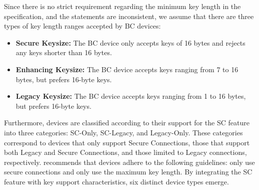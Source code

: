 \documentclass[../main.tex]{subfiles}  %
\begin{document}
Since there is no strict requirement regarding the minimum key length in the specification, and the statements are inconsistent, we assume that there are three types of key length ranges accepted by BC devices:
\begin{itemize}[leftmargin=*]
    \item \textbf{Secure Keysize:} The BC device only accepts keys of 16 bytes and rejects any keys shorter than 16 bytes.
    \item \textbf{Enhancing Keysize:} The BC device accepts keys ranging from 7 to 16 bytes, but prefers 16-byte keys.
    \item \textbf{Legacy Keysize:} The BC device accepts keys ranging from 1 to 16 bytes, but prefers 16-byte keys.
\end{itemize}
Furthermore, devices are classified according to their support for the SC feature into three categories: SC-Only, SC-Legacy, and Legacy-Only.
These categories correspond to devices that only support Secure Connections, those that support both Legacy and Secure Connections, and those limited to Legacy connections, respectively.
\cite{padgette2017guide} recommends that devices adhere to the following guidelines: only use secure connections and only use the maximum key length.
By integrating the SC feature with key support characteristics, six distinct device types emerge.
\end{document}
